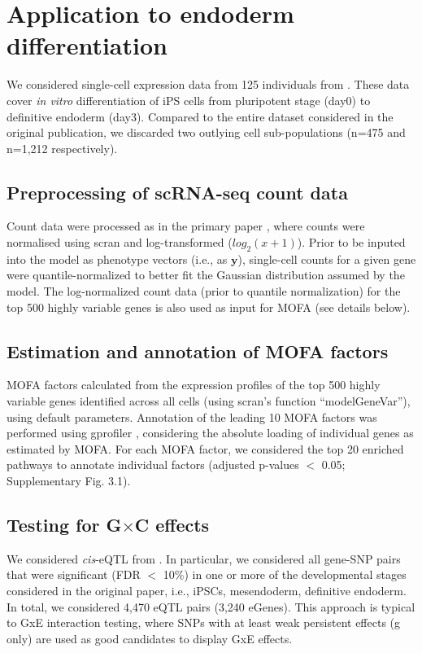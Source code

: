 \section{Application to endoderm differentiation}\label{sec:endodiff}

We considered single-cell expression data from 125 individuals from \cite{cuomo2020single}.
These data cover \textit{in vitro} differentiation of iPS cells from pluripotent stage (day0) to definitive endoderm (day3).
Compared to the entire dataset considered in the original publication, we discarded two outlying cell sub-populations (n=475 and n=1,212 respectively).

\subsection{Preprocessing of scRNA-seq count data}

Count data were processed as in the primary paper \cite{cuomo2020single}, where counts were normalised using scran \cite{lun2016pooling} and log-transformed ($log_2(x+1)$).
Prior to be inputed into the model as phenotype vectors (i.e., as $\mathbf{y}$), single-cell counts for a given gene were quantile-normalized to better fit the Gaussian distribution assumed by the model.
The log-normalized count data (prior to quantile normalization) for the top 500 highly variable genes is also used as input for MOFA (see details below).

\subsection{Estimation and annotation of MOFA factors}

MOFA \cite{argelaguet2018multi} factors calculated from the expression profiles of the top 500 highly variable genes identified across all cells (using scran’s function “modelGeneVar”), using default parameters. 
Annotation of the leading 10 MOFA factors was performed using gprofiler \cite{raudvere2019g}, considering the absolute loading of individual genes as estimated by MOFA.   
For each MOFA factor, we considered the top 20 enriched pathways to annotate individual factors (adjusted p-values $<$ 0.05; Supplementary Fig. 3.1).

\subsection{Testing for G$\times$C effects}

We considered \emph{cis}-eQTL from \cite{cuomo2020single}. 
In particular, we considered all gene-SNP pairs that were  significant (FDR $<$ 10\%) in one or more of the developmental stages considered in the original paper, i.e., iPSCs, mesendoderm, definitive endoderm. 
In total, we considered 4,470 eQTL pairs (3,240 eGenes).
This approach is typical to GxE interaction testing, where SNPs with at least weak persistent effects (g only) are used as good candidates to display GxE effects. 
\\

